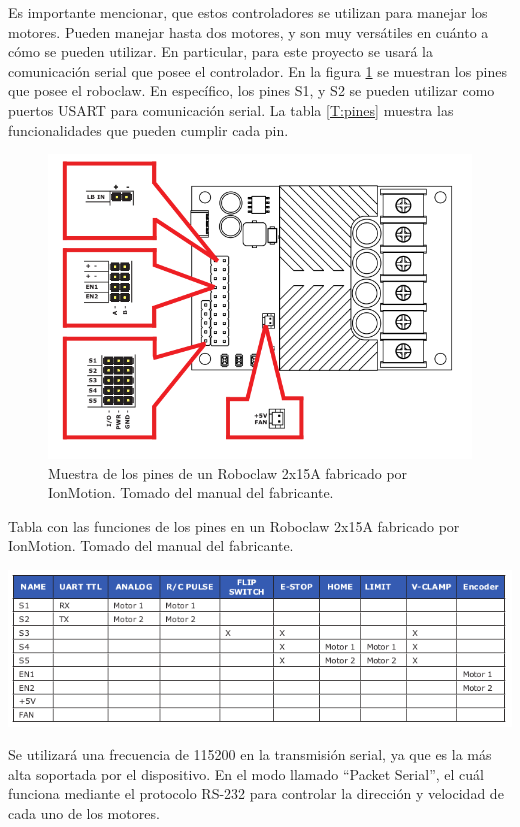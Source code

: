 Es importante mencionar, que estos controladores se utilizan para manejar los motores. Pueden manejar hasta dos motores, y son muy versátiles en cuánto a cómo se pueden utilizar. En particular, para este proyecto se usará la comunicación serial que posee el controlador. En la figura \ref{F:roboclaw} se muestran los pines que posee el roboclaw. En específico, los pines S1, y S2 se pueden utilizar como puertos USART para comunicación serial. La tabla \ref{T:pines} muestra las funcionalidades que pueden cumplir cada pin.

\begin{figure}[H]
\centering
\includegraphics[scale=0.5]{imagenes/roboclaw.png}
\caption{Muestra de los pines de un Roboclaw 2x15A fabricado por IonMotion. Tomado del manual del fabricante.}
\label{F:roboclaw}
\end{figure}

\begin{table}[H]
\centering
\caption{Tabla con las funciones de los pines en un Roboclaw 2x15A fabricado por IonMotion. Tomado del manual del fabricante.}
\includegraphics[scale=0.7]{imagenes/pines.png}
\label{T:pines}
\end{table}

Se utilizará una frecuencia de 115200 en la transmisión serial, ya que es la más alta soportada por el dispositivo. En el modo llamado ``Packet Serial'', el cuál funciona mediante el protocolo RS-232 para controlar la dirección y velocidad de cada uno de los motores.

